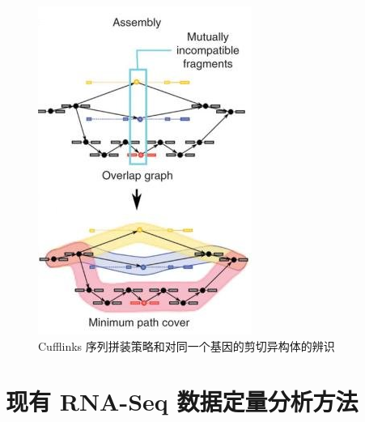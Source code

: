 \begin{figure}[!t]
\centering
\includegraphics[height=0.5\textheight]{figures/cufflinks-assembly.jpg}
\caption{Cufflinks 序列拼装策略和对同一个基因的剪切异构体的辨识 \cite{cufflinks.2010}}
\label{intro-cufflinks-assembly}
\end{figure}

\section{现有 RNA-Seq 数据定量分析方法}


